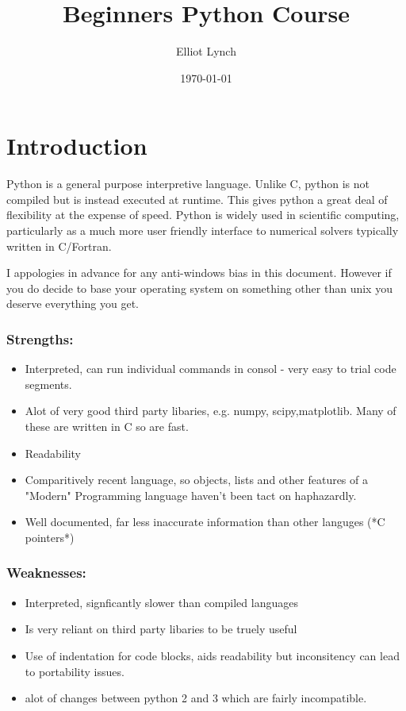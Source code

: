 \documentclass[11pt,a4paper]{article}
\title{Beginners Python Course}
\author{Elliot Lynch}
\date{\today}
\begin{document}
\maketitle

\tableofcontents

\section{Introduction}

Python is a general purpose interpretive language. Unlike C, python is not compiled but is instead executed at runtime. This gives python a great deal of flexibility at the expense of speed. Python is widely used in scientific computing, particularly as a much more user friendly interface to numerical solvers typically written in C/Fortran.

I appologies in advance for any anti-windows bias in this document. However if you do decide to base your operating system on something other than unix you deserve everything you get.

\subsubsection{Strengths:}
\begin{itemize}
\item Interpreted, can run individual commands in consol - very easy to trial code segments.
\item Alot of very good third party libaries, e.g. numpy, scipy,matplotlib. Many of these are written in C so are fast.
\item Readability
\item Comparitively recent language, so objects, lists and other features of a "Modern" Programming language haven't been tact on haphazardly.
\item Well documented, far less inaccurate information than other languges (*C pointers*)
\end{itemize}

\subsubsection{Weaknesses:}
\begin{itemize}
\item Interpreted, signficantly slower than compiled languages
\item Is very reliant on third party libaries to be truely useful
\item Use of indentation for code blocks, aids readability but inconsitency can lead to portability issues.
\item alot of changes between python 2 and 3 which are fairly incompatible.
\end{itemize}
\end{document}
